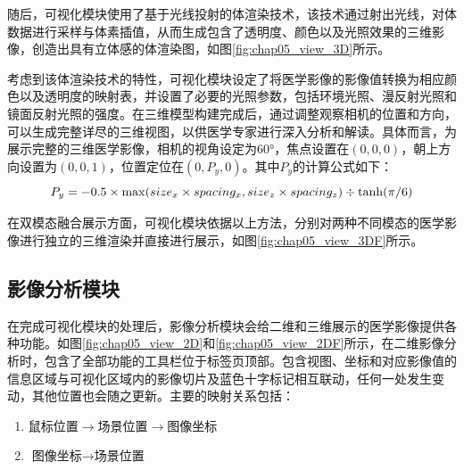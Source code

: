 随后，可视化模块使用了基于光线投射的体渲染技术，该技术通过射出光线，对体数据进行采样与体素插值，从而生成包含了透明度、颜色以及光照效果的三维影像，创造出具有立体感的体渲染图，如图\ref{fig:chap05_view_3D}所示。

考虑到该体渲染技术的特性，可视化模块设定了将医学影像的影像值转换为相应颜色以及透明度的映射表，并设置了必要的光照参数，包括环境光照、漫反射光照和镜面反射光照的强度。在三维模型构建完成后，通过调整观察相机的位置和方向，可以生成完整详尽的三维视图，以供医学专家进行深入分析和解读。具体而言，为展示完整的三维医学影像，相机的视角设定为60°，焦点设置在\((0,0,0)\)，朝上方向设置为\((0,0,1)\)，位置定位在\((0,P_y,0)\)。其中\(P_y\)的计算公式如下：
\begin{equation}
  P_y = -0.5 \times \max(size_x \times spacing_x, size_z \times spacing_z) \div \tanh(\pi / 6)\\
\end{equation}

在双模态融合展示方面，可视化模块依据以上方法，分别对两种不同模态的医学影像进行独立的三维渲染并直接进行展示，如图\ref{fig:chap05_view_3DF}所示。

\subsection{影像分析模块}

在完成可视化模块的处理后，影像分析模块会给二维和三维展示的医学影像提供各种功能。如图\ref{fig:chap05_view_2D}和\ref{fig:chap05_view_2DF}所示，在二维影像分析时，包含了全部功能的工具栏位于标签页顶部。包含视图、坐标和对应影像值的信息区域与可视化区域内的影像切片及蓝色十字标记相互联动，任何一处发生变动，其他位置也会随之更新。主要的映射关系包括：
\begin{enumerate}
  \item \(\text{鼠标位置} \rightarrow \text{场景位置} \rightarrow \text{图像坐标}\)\label{en:chap05_1}
  \item \(\text{图像坐标} \rightarrow \text{场景位置}\)\label{en:chap05_2}
\end{enumerate}

